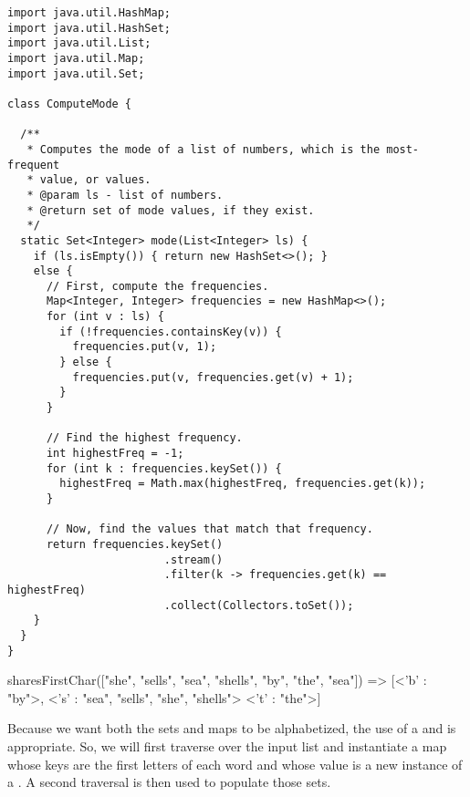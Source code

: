 \begin{lstlisting}[language=MyJava]
import java.util.HashMap;
import java.util.HashSet;
import java.util.List;
import java.util.Map;
import java.util.Set;

class ComputeMode {

  /**
   * Computes the mode of a list of numbers, which is the most-frequent
   * value, or values.
   * @param ls - list of numbers.
   * @return set of mode values, if they exist.
   */
  static Set<Integer> mode(List<Integer> ls) {
    if (ls.isEmpty()) { return new HashSet<>(); } 
    else {
      // First, compute the frequencies.
      Map<Integer, Integer> frequencies = new HashMap<>();
      for (int v : ls) {
        if (!frequencies.containsKey(v)) {
          frequencies.put(v, 1);
        } else {
          frequencies.put(v, frequencies.get(v) + 1);
        }
      } 

      // Find the highest frequency.
      int highestFreq = -1;
      for (int k : frequencies.keySet()) {
        highestFreq = Math.max(highestFreq, frequencies.get(k));
      }

      // Now, find the values that match that frequency.
      return frequencies.keySet()
                        .stream()
                        .filter(k -> frequencies.get(k) == highestFreq)
                        .collect(Collectors.toSet());
    }
  }
}
\end{lstlisting}


\begin{verbnobox}[\small]
sharesFirstChar(["she", "sells", "sea", "shells", "by", "the", "sea"])
  => [<'b' : {"by"}>, 
      <'s' : {"sea", "sells", "she", "shells"}>
      <'t' : {"the"}>]
\end{verbnobox}

Because we want both the sets and maps to be alphabetized, the use of a  and  is appropriate. So, we will first traverse over the input list and instantiate a map whose keys are the first letters of each word and whose value is a new instance of a . A second traversal is then used to populate those sets.


